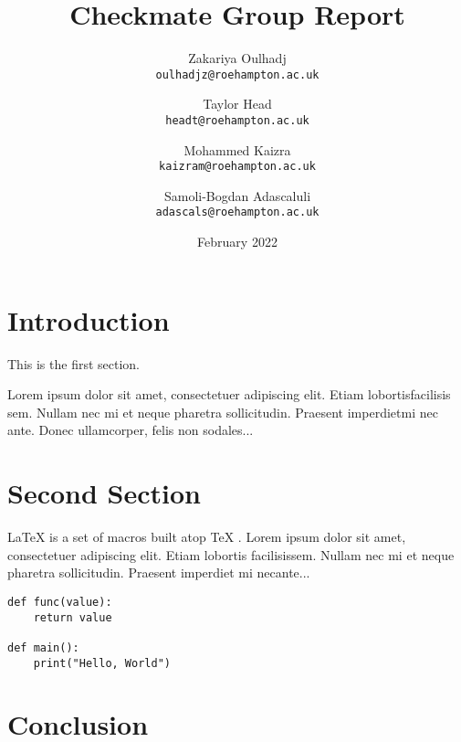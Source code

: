 \documentclass{report}
\title{Checkmate Group Report}
\author{
  Zakariya Oulhadj\\
  \texttt{oulhadjz@roehampton.ac.uk}
  \and
  Taylor Head\\
  \texttt{headt@roehampton.ac.uk}
  \and
  Mohammed Kaizra\\
  \texttt{kaizram@roehampton.ac.uk}
  \and
  Samoli-Bogdan Adascaluli\\
  \texttt{adascals@roehampton.ac.uk}
}
\date{February 2022}
\begin{document}
\maketitle
\tableofcontents


\section{Introduction}
   
This is the first section.
      
Lorem  ipsum  dolor  sit  amet,  consectetuer  adipiscing  
elit.   Etiam  lobortisfacilisis sem.  Nullam nec mi et 
neque pharetra sollicitudin.  Praesent imperdietmi nec ante. 
Donec ullamcorper, felis non sodales...

\section{Second Section}

\LaTeX{} \cite{latex2e} is a set of macros built atop \TeX{} \cite{texbook}.
Lorem ipsum dolor sit amet, consectetuer adipiscing elit.  
Etiam lobortis facilisissem.  Nullam nec mi et neque pharetra 
sollicitudin.  Praesent imperdiet mi necante...


\begin{verbatim}
def func(value):
    return value

def main():
    print("Hello, World")

\end{verbatim}
         
\section{Conclusion}


\newpage


 
\end{document}
